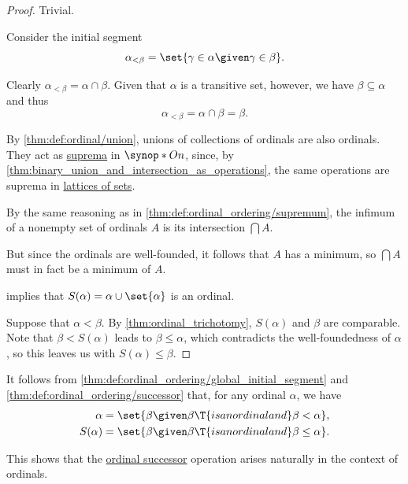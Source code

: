 \begin{proof}
   Trivial.

   Consider the initial segment
  \begin{equation*}
    \alpha_{<\beta} = \set{ \gamma \in \alpha \given \gamma \in \beta }.
  \end{equation*}

  Clearly \( \alpha_{<\beta} = \alpha \cap \beta \). Given that \( \alpha \) is a transitive set, however, we have \( \beta \subseteq \alpha \) and thus
  \begin{equation*}
    \alpha_{<\beta} = \alpha \cap \beta = \beta.
  \end{equation*}

   By \cref{thm:def:ordinal/union}, unions of collections of ordinals are also ordinals. They act as \hyperref[def:extremal_points/supremum_and_infimum]{suprema} in \( \synop*{On} \), since, by \cref{thm:binary_union_and_intersection_as_operations}, the same operations are suprema in \hyperref[def:lattice_of_sets]{lattices of sets}.

   By the same reasoning as in \cref{thm:def:ordinal_ordering/supremum}, the infimum of a nonempty set of ordinals \( A \) is its intersection \( \bigcap A \).

  But since the ordinals are well-founded, it follows that \( A \) has a minimum, so \( \bigcap A \) must in fact be a minimum of \( A \).

    implies that \( S(\alpha) = \alpha \cup \set{ \alpha } \) is an ordinal.

  Suppose that \( \alpha < \beta \). By \cref{thm:ordinal_trichotomy}, \( S(\alpha) \) and \( \beta \) are comparable. Note that \( \beta < S(\alpha) \) leads to \( \beta \leq \alpha \), which contradicts the well-foundedness of \( \alpha \), so this leaves us with \( S(\alpha) \leq \beta \).
\end{proof}

\begin{remark}\label{rem:def:ordinal_successor}
  It follows from \cref{thm:def:ordinal_ordering/global_initial_segment} and \cref{thm:def:ordinal_ordering/successor} that, for any ordinal \( \alpha \), we have
  \begin{align*}
    \alpha    &= \set{ \beta \given \beta \T{is an ordinal and} \beta < \alpha }, \\
    S(\alpha) &= \set{ \beta \given \beta \T{is an ordinal and} \beta \leq \alpha }.
  \end{align*}

  This shows that the \hyperref[def:ordinal_successor]{ordinal successor} operation arises naturally in the context of ordinals.
\end{remark}


